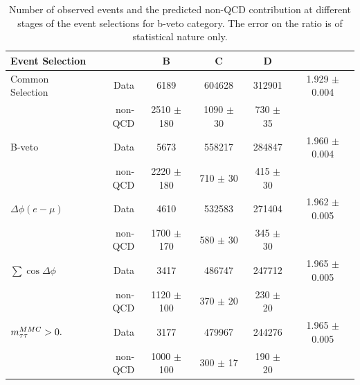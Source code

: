 \begin{table} [p]
	\begin{tabular}[c]{l r c c c c}
\hline
\hline 
Event Selection  &  		& B & C & D &  \rqcd \\ 
\hline
Common Selection 	&   Data	&6189			&604628			&312901		    &	1.929 $\pm$  	0.004		\\
	        &   non-QCD	&2510 $\pm$  180  	&1090 $\pm$   30  	&730	$\pm$ 35    &				\\
\hline
B-veto	     	&   Data	&5673		  & 558217 		& 284847		    &	1.960	$\pm$	0.004	\\
	     	&   non-QCD	&2220	$\pm$ 180 & 710 $\pm$ 30	& 415 $\pm$	30	    &				\\
\hline
$\Delta\phi(e-\mu)$  &   Data		&4610		&532583 		&271404		    	    &	1.962	$\pm$	0.005	\\
	     &   non-QCD	&1700 $\pm$170	&580 $\pm$	30	& 345 $\pm$	30	    &				\\
\hline
$\sum\cos\Delta\phi$ &   Data& 3417	&486747 		& 247712	   		    &	1.965	$\pm$	0.005 	\\
	     &   non-QCD     & 1120  $\pm$ 100	& 370 $\pm$ 	20		& 230 $\pm$	20  &				\\
\hline
$m_{\tau\tau}^{MMC} > 0.$    &  Data		& 3177		& 479967 		& 244276	    	    &	1.965	$\pm$	0.005	\\
	     &   non-QCD	& 1000 $\pm$ 100	& 300  $\pm$ 17		&190	$\pm$ 20    &			\\[1ex]
\hline
\hline
	\end{tabular}
	\caption{Number of observed events and the predicted non-QCD contribution at different stages of the event selections for b-veto category. 
	The error on the \rqcd ratio is of statistical nature only.}
	\centering
	\label{table:qcd_yield_bveto}
\end{table}

